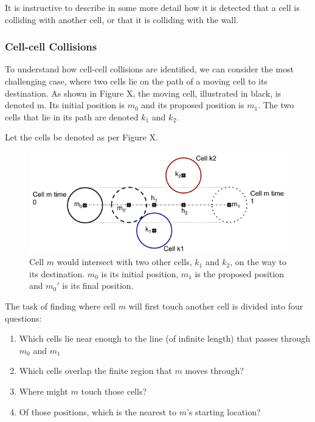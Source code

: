 \documentclass[12pt]{article}
\begin{document}
It is instructive to describe in some more detail how it is detected 
that a cell is colliding with another cell, or that it is colliding with 
the wall.

\subsubsection{Cell-cell Collisions}
To understand how cell-cell collisions are identified, we can consider 
the most challenging case, where two cells lie on the path of a moving 
cell to its destination. As shown in Figure X, the moving cell, 
illustrated in black, is denoted m. Its initial position is \(m_0\) 
and its proposed position is \(m_1\). The two cells that lie in its 
path are denoted \(k_1\) and \(k_2\).

Let the cells be denoted as per Figure X.

\begin{figure}[H]
\centering
\includegraphics[width=\textwidth]{media/collision.png}
\caption{Cell \(m\) would intersect with two other 
  cells, \(k_1\) and \(k_2\), on the way to its destination. 
  \(m_0\) is its initial position, \(m_1\) is the proposed position and 
\(m_0'\) is its final position.}
\end{figure}

The task of finding where cell \(m\) will first touch another 
cell is divided into four questions:

\begin{enumerate}
\item Which cells lie near enough to the line (of infinite length) that 
passes through \(m_0\) and \(m_1\)
\item Which cells overlap the finite region that \(m\) moves 
through?
\item Where might \(m\) touch those cells?
\item Of those positions, which is the nearest to \(m\)'s 
starting location?
\end{enumerate}
\end{document}
